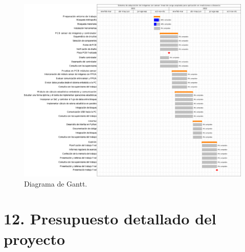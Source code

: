 \documentclass[
11pt, %
codirector, %
]{charter}
\begin{document}
\begin{landscape}
\begin{figure}[htpb]
\centering 
\includegraphics[height=.95\textheight]{./Figuras/gantt.png}
\caption{Diagrama de Gantt.}
\label{fig:diagGantt}
\end{figure}
\end{landscape}




\section{12. Presupuesto detallado del proyecto}
\label{sec:presupuesto}
\end{document}

